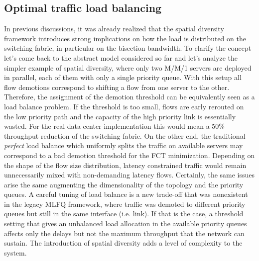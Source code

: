 \subsection{Optimal traffic load balancing}
In previous discussions, it was already realized that the spatial diversity framework introduces strong implications on how the load is distributed on the switching fabric, in particular on the bisection bandwidth. To clarify the concept let's come back to the abstract model considered so far and let's analyze the simpler example of spatial diversity, where only two M/M/1 servers are deployed in parallel, each of them with only a single priority queue. With this setup all flow demotions correspond to shifting a flow from one server to the other. Therefore, the assignment of the demotion threshold can be equivalently seen as a load balance problem. If the threshold is too small, flows are early rerouted on the low priority path and the capacity of the high priority link is essentially wasted. For the real data center implementation this would mean a 50\% throughput reduction of the switching fabric. On the other end, the traditional \textit{perfect} load balance which uniformly splits the traffic on available servers may correspond to a bad demotion threshold for the FCT minimization. Depending on the shape of the flow size distribution, latency constrained traffic would remain unnecessarily mixed with non-demanding latency flows. Certainly, the same issues arise the same augmenting the dimensionality of the topology and the priority queues. 
A careful tuning of load balance is a new trade-off that was nonexistent in the legacy MLFQ framework, where traffic was demoted to different priority queues but still in the same interface (i.e. link). If that is the case, a threshold setting that gives an unbalanced load allocation in the available priority queues affects only the delays but not the maximum throughput that the network can sustain. The introduction of spatial diversity adds a level of complexity to the system. 

